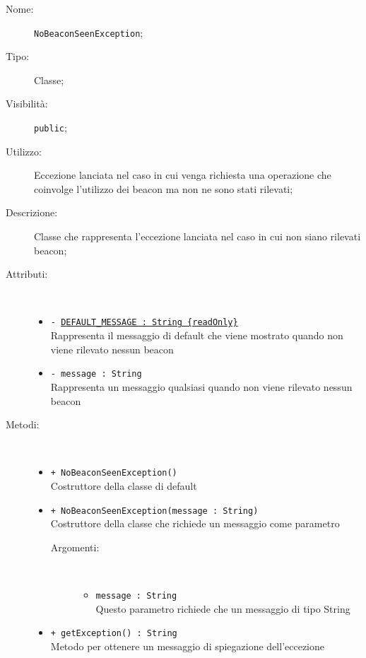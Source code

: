\documentclass[../DefinizioneDiProdotto.tex]{subfiles}
\begin{document}
\begin{description}
	\item[Nome:] \texttt{NoBeaconSeenException};
	\item[Tipo:] Classe;
	\item[Visibilità:] \texttt{public};
	\item[Utilizzo:] Eccezione lanciata nel caso in cui venga richiesta una operazione che coinvolge l'utilizzo dei beacon ma non ne sono stati rilevati;
	\item[Descrizione:] Classe che rappresenta l'eccezione lanciata nel caso in cui non siano rilevati beacon;
	\item[Attributi:] \
	\begin{itemize}
		\item \texttt{- \underline{DEFAULT\_MESSAGE : String \{readOnly\}}}\\
		Rappresenta il messaggio di default che viene mostrato quando non viene rilevato nessun beacon
		
		\item \texttt{- message : String}\\
		Rappresenta un messaggio qualsiasi quando non viene rilevato nessun beacon
		
	\end{itemize}
	\item[Metodi:] \
	\begin{itemize}
		\item \texttt{+ NoBeaconSeenException()}\\
		Costruttore della classe di default
		\item \texttt{+ NoBeaconSeenException(message : String)}\\
		Costruttore della classe che richiede un messaggio come parametro
		\begin{description}
			\item[Argomenti:] \
			\begin{itemize}
				\item \texttt{message : String}\\
				Questo parametro richiede che un messaggio di tipo  String\end{itemize}
		\end{description}
		\item \texttt{+ getException() : String}\\
		Metodo per ottenere un messaggio di spiegazione dell'eccezione
	\end{itemize}
\end{description}
\end{document}
